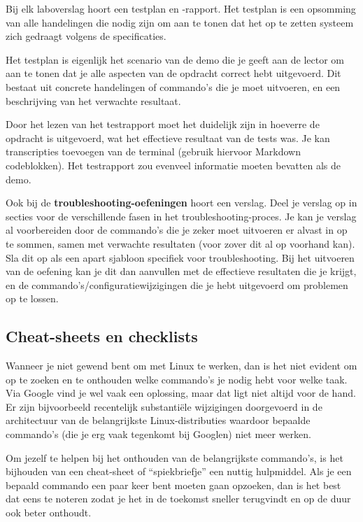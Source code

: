 Bij elk laboverslag hoort een testplan en -rapport. Het testplan is een opsomming van alle handelingen die nodig zijn om aan te tonen dat het op te zetten systeem zich gedraagt volgens de specificaties.

Het testplan is eigenlijk het scenario van de demo die je geeft aan de lector om aan te tonen dat je alle aspecten van de opdracht correct hebt uitgevoerd. Dit bestaat uit concrete handelingen of commando's die je moet uitvoeren, en een beschrijving van het verwachte resultaat.

Door het lezen van het testrapport moet het duidelijk zijn in hoeverre de opdracht is uitgevoerd, wat het effectieve resultaat van de tests was. Je kan transcripties toevoegen van de terminal (gebruik hiervoor Markdown codeblokken). Het testrapport zou evenveel informatie moeten bevatten als de demo.

Ook bij de \textbf{troubleshooting-oefeningen} hoort een verslag. Deel je verslag op in secties voor de verschillende fasen in het troubleshooting-proces. Je kan je verslag al voorbereiden door de commando's die je zeker moet uitvoeren er alvast in op te sommen, samen met verwachte resultaten (voor zover dit al op voorhand kan). Sla dit op als een apart sjabloon specifiek voor troubleshooting. Bij het uitvoeren van de oefening kan je dit dan aanvullen met de effectieve resultaten die je krijgt, en de commando's/configuratiewijzigingen die je hebt uitgevoerd om problemen op te lossen.

\subsection{Cheat-sheets en checklists}
\label{subs:cheat-sheets-en-checklists}

Wanneer je niet gewend bent om met Linux te werken, dan is het niet evident om op te zoeken en te onthouden welke commando's je nodig hebt voor welke taak. Via Google vind je wel vaak een oplossing, maar dat ligt niet altijd voor de hand. Er zijn bijvoorbeeld recentelijk substantiële wijzigingen doorgevoerd in de architectuur van de belangrijkste Linux-distributies waardoor bepaalde commando's (die je erg vaak tegenkomt bij Googlen) niet meer werken.

Om jezelf te helpen bij het onthouden van de belangrijkste commando's, is het bijhouden van een cheat-sheet of ``spiekbriefje'' een nuttig hulpmiddel. Als je een bepaald commando een paar keer bent moeten gaan opzoeken, dan is het best dat eens te noteren zodat je het in de toekomst sneller terugvindt en op de duur ook beter onthoudt.

